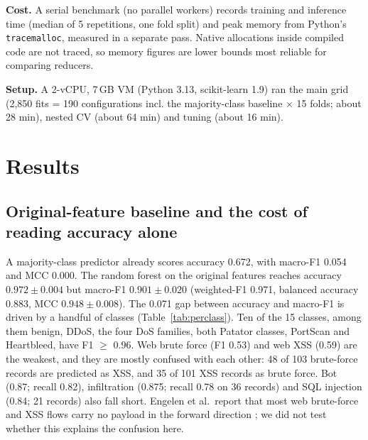 \documentclass[runningheads]{llncs}
\begin{document}
\textbf{Cost.} A serial benchmark (no parallel workers) records training and inference time (median of 5 repetitions, one fold split) and peak memory from Python's \texttt{tracemalloc}, measured in a separate pass. Native allocations inside compiled code are not traced, so memory figures are lower bounds most reliable for comparing reducers.

\textbf{Setup.} A 2-vCPU, 7\,GB VM (Python 3.13, scikit-learn 1.9) ran the main grid (2{,}850 fits = 190 configurations incl. the majority-class baseline $\times$ 15 folds; about 28 min), nested CV (about 64 min) and tuning (about 16 min).

\section{Results}
\subsection{Original-feature baseline and the cost of reading accuracy alone}
A majority-class predictor already scores accuracy 0.672, with macro-F1 0.054 and MCC 0.000. The random forest on the original features reaches accuracy $0.972\pm0.004$ but macro-F1 $0.901\pm0.020$ (weighted-F1 0.971, balanced accuracy 0.883, MCC $0.948\pm0.008$). The 0.071 gap between accuracy and macro-F1 is driven by a handful of classes (Table~\ref{tab:perclass}). Ten of the 15 classes, among them benign, DDoS, the four DoS families, both Patator classes, PortScan and Heartbleed, have F1 $\ge$ 0.96. Web brute force (F1 0.53) and web XSS (0.59) are the weakest, and they are mostly confused with each other: 48 of 103 brute-force records are predicted as XSS, and 35 of 101 XSS records as brute force. Bot (0.87; recall 0.82), infiltration (0.875; recall 0.78 on 36 records) and SQL injection (0.84; 21 records) also fall short. Engelen et al.\ report that most web brute-force and XSS flows carry no payload in the forward direction \cite{engelen2021}; we did not test whether this explains the confusion here.

\begin{table}[!htbp]
\caption{Per-class results of the selected model (RF, original features), pooled out-of-fold predictions, first repeat.}\label{tab:perclass}
\centering\scriptsize

\end{table}
\end{document}
